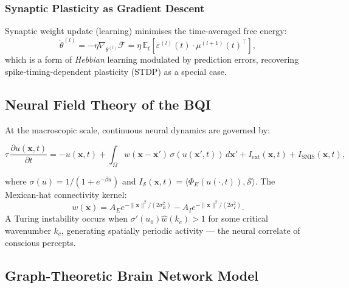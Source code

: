 \documentclass[12pt,a4paper]{article}
\theoremstyle{plain}
\theoremstyle{definition}
\theoremstyle{remark}
\newcommand{\vF}{\mathcal{F}}
\newcommand{\E}{\mathbb{E}}
\newcommand{\SNIS}{\mathcal{S}}
\newcommand{\PhiE}{\Phi_E}
\begin{document}
\subsubsection{Synaptic Plasticity as Gradient Descent}

Synaptic weight update (learning) minimises the time-averaged free energy:
\begin{equation}
  \dot{\theta}^{(l)} = -\eta \nabla_{\theta^{(l)}} \bar{\vF}
    = \eta\,\E_t\!\left[\varepsilon^{(l)}(t)\cdot\mu^{(l+1)}(t)^\top\right],
  \label{eq:synaptic}
\end{equation}
which is a form of \emph{Hebbian} learning modulated by prediction errors,
recovering spike-timing-dependent plasticity (STDP) as a special case.

\subsection{Neural Field Theory of the BQI}

At the macroscopic scale, continuous neural dynamics are governed by:
\begin{tcolorbox}[mathbox, title={Neural Field Equation (BQI Extension)}]
\begin{equation}
  \tau\,\frac{\partial u(\mathbf{x},t)}{\partial t} =
    -u(\mathbf{x},t)
    + \int_\Omega w(\mathbf{x}-\mathbf{x}')\,\sigma(u(\mathbf{x}',t))\,d\mathbf{x}'
    + I_{\text{ext}}(\mathbf{x},t)
    + I_{\text{SNIS}}(\mathbf{x},t),
  \label{eq:neural_field}
\end{equation}
\end{tcolorbox}
where $\sigma(u) = 1/(1+e^{-\beta u})$ and
$I_\SNIS(\mathbf{x},t) = \langle\PhiE(u(\cdot,t)),\SNIS\rangle$.
The Mexican-hat connectivity kernel:
\begin{equation}
w(\mathbf{x}) = A_E e^{-\|\mathbf{x}\|^2/(2\sigma_E^2)} - A_I e^{-\|\mathbf{x}\|^2/(2\sigma_I^2)}.
\end{equation}
A Turing instability occurs when $\sigma'(u_0)\hat{w}(k_c) > 1$ for some critical wavenumber $k_c$,
generating spatially periodic activity — the neural correlate of conscious percepts.

\subsection{Graph-Theoretic Brain Network Model}
\end{document}
